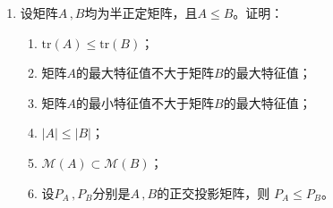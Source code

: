\documentclass[10pt]{article}
\theoremstyle{definition}
\theoremstyle{definition}
\begin{document}
\begin{enumerate}
    \begin{proof}
        令
        \begin{equation*}
            \Sigma=
            \begin{pmatrix}
                1 & 1 \\
                0 & 0
            \end{pmatrix} \qquad P=
            \begin{pmatrix}
                \frac{\sqrt{2}}{2} \\
                \frac{\sqrt{2}}{2}
            \end{pmatrix} \qquad Q=
            \begin{pmatrix}
                -\frac{\sqrt{2}}{2} \\
                \frac{\sqrt{2}}{2}
            \end{pmatrix}
        \end{equation*}
        容易验证，矩阵$\Sigma$的特征值为0和1，$(P\  Q)$为正交阵且$P'\Sigma P=1\, ,Q'\Sigma Q=0$。
    \end{proof}

\item	%
    设矩阵$A\, ,B$均为半正定矩阵，且$A\le B$。证明：

    \begin{enumerate}[label=(\roman*)]
        \item$\mathrm{tr}(A) \le \mathrm{tr}(B)$；
        \item 矩阵$A$的最大特征值不大于矩阵$B$的最大特征值；
        \item 矩阵$A$的最小特征值不大于矩阵$B$的最大特征值；
        \item$|A|\le |B|$；
        \item$\mathcal{M}(A)\subset \mathcal{M}(B)$；
        \item 设$P_A\, , P_B$分别是$A\, ,B$的正交投影矩阵，则
            $P_A \le P_B$。
    \end{enumerate}


\end{enumerate}
\end{document}
